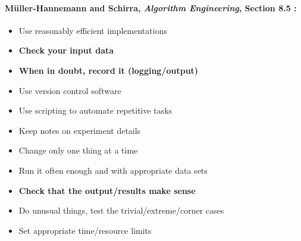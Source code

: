 \documentclass[12pt]{article}
\begin{document}
\paragraph{M{\"u}ller-Hannemann and Schirra, \emph{Algorithm Engineering}, Section 8.5 \cite{muller2010algeng}:}
\begin{itemize}
    \item Use reasonably efficient implementations
    \item \textbf{Check your input data}
    \item \textbf{When in doubt, record it (logging/output)}
    \item Use version control software
    \item Use scripting to automate repetitive tasks
    \item Keep notes on experiment details
    \item Change only one thing at a time
    \item Run it often enough and with appropriate data sets
    \item \textbf{Check that the output/results make sense}
    \item Do unusual things, test the trivial/extreme/corner cases
    \item Set appropriate time/resource limits
\end{itemize}


\end{document}
